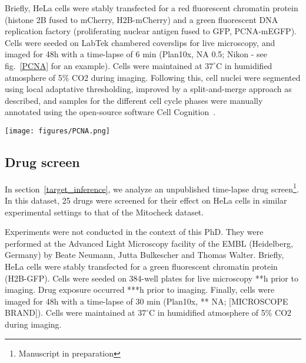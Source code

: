 Briefly, HeLa cells were stably transfected for a red fluorescent chromatin protein (histone 2B fused to mCherry, H2B-mCherry) and a green fluorescent DNA replication factory (proliferating nuclear antigen fused to GFP, PCNA-mEGFP). Cells were seeded on LabTek chambered coverslips for live microscopy, and imaged for 48h with a time-lapse of 6 min (Plan10x, NA 0.5; Nikon - see fig.~\ref{PCNA} for an example). Cells were maintained at $37^\circ$C in humidified atmosphere of 5\% CO2 during imaging. Following this, cell nuclei were segmented using local adaptative thresholding, improved by a split-and-merge approach as described, and samples for the different cell cycle phases were manually annotated using the open-source software Cell Cognition~\cite{cellcognition}.
%
\begin{figure*}[ht]
\centerline{\texttt{[image: figures/PCNA.png]}}
\caption{Image from a control video of the PCNA dataset (white: histone 2B, green: PCNA)}
\label{PCNA}
\end{figure*}  
\subsection{Drug screen}
In section~\ref{target_inference}, we analyze an unpublished time-lapse drug screen\footnote{Manuscript in preparation}. In this dataset, 25 drugs were screened for their effect on HeLa cells in similar experimental settings to that of the Mitocheck dataset.

Experiments were not conducted in the context of this PhD. They were performed at the Advanced Light Microscopy facility of the EMBL (Heidelberg, Germany) by Beate Neumann, Jutta Bulkescher and Thomas Walter. Briefly, HeLa cells were stably transfected for a green fluorescent chromatin protein (H2B-GFP). Cells were seeded on 384-well plates for live microscopy **h prior to imaging. Drug exposure occurred ***h prior to imaging. Finally, cells were imaged for 48h with a time-lapse of 30 min (Plan10x, ** NA; [MICROSCOPE BRAND]). Cells were maintained at $37^\circ$C in humidified atmosphere of 5\% CO2 during imaging.

